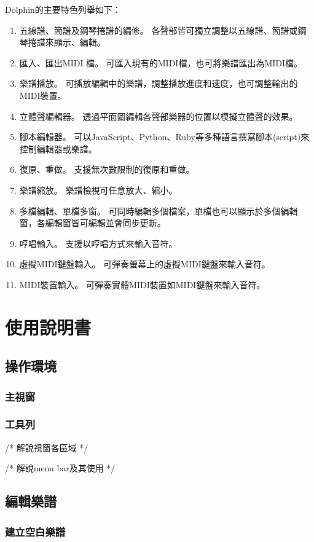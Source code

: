 \documentclass[12pt,a4paper,oneside]{report}
\begin{document}
Dolphin的主要特色列舉如下：
\begin{enumerate}
\item 五線譜、簡譜及鋼琴捲譜的編修。
      各聲部皆可獨立調整以五線譜、簡譜或鋼琴捲譜來顯示、編輯。
\item 匯入、匯出MIDI 檔。
      可匯入現有的MIDI檔，也可將樂譜匯出為MIDI檔。
\item 樂譜播放。
      可播放編輯中的樂譜，調整播放進度和速度，也可調整輸出的MIDI裝置。
\item 立體聲編輯器。
      透過平面圖編輯各聲部樂器的位置以模擬立體聲的效果。
\item 腳本編輯器。
      可以JavaScript、Python、Ruby等多種語言撰寫腳本(script)來控制編輯器或樂譜。
\item 復原、重做。
      支援無次數限制的復原和重做。
\item 樂譜縮放。
      樂譜檢視可任意放大、縮小。
\item 多檔編輯、單檔多窗。
      可同時編輯多個檔案，單檔也可以顯示於多個編輯窗，各編輯窗皆可編輯並會同步更新。
\item 哼唱輸入。
      支援以哼唱方式來輸入音符。
\item 虛擬MIDI鍵盤輸入。
      可彈奏螢幕上的虛擬MIDI鍵盤來輸入音符。
\item MIDI裝置輸入。
      可彈奏實體MIDI裝置如MIDI鍵盤來輸入音符。 
\end{enumerate}

\chapter{使用說明書}
\section{操作環境}
\subsection{主視窗}
\subsection{工具列}
/* 
解說視窗各區域
*/

/* 
解說menu bar及其使用
*/
\section{編輯樂譜}
   \subsection{建立空白樂譜}
\end{document}
